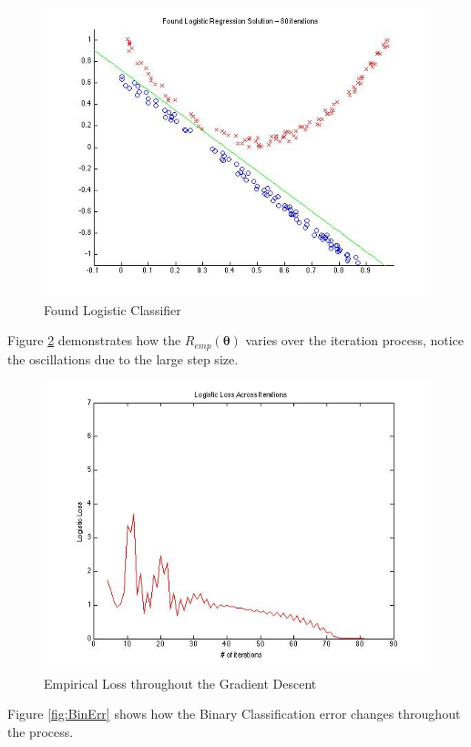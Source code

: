 \documentclass[paper=a4, fontsize=11pt]{scrartcl} %
\begin{document}
\begin{figure}
\centering
\includegraphics[scale=0.4]{prob3sol.jpg}
\caption{Found Logistic Classifier}
\label{fig:classifier}
\end{figure}

Figure \ref{fig:loss} demonstrates how the $R_{emp}(\bm{\theta})$ varies over the iteration process, notice the oscillations due to the large step size.

\begin{figure}
\centering
\includegraphics[scale=0.4]{logisticloss.jpg}
\caption{Empirical Loss throughout the Gradient Descent}
\label{fig:loss}
\end{figure}

Figure \ref{fig:BinErr} shows how the Binary Classification error changes throughout the process.
\end{document}
